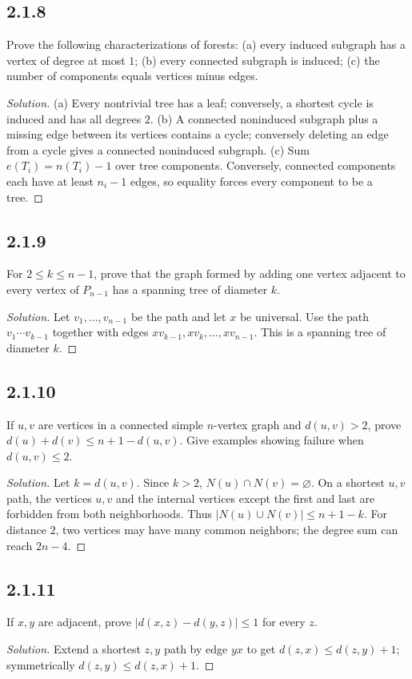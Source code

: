 \documentclass[12pt]{amsart}
\newenvironment{solution}{\begin{proof}[Solution]}{\end{proof}}
\begin{document}
    \subsection*{2.1.8} Prove the following characterizations of forests: (a) every induced subgraph has a vertex of degree at most $1$; (b) every connected subgraph is induced; (c) the number of components equals vertices minus edges.
    \begin{solution}(a) Every nontrivial tree has a leaf; conversely, a shortest cycle is induced and has all degrees $2$. (b) A connected noninduced subgraph plus a missing edge between its vertices contains a cycle; conversely deleting an edge from a cycle gives a connected noninduced subgraph. (c) Sum $e(T_i)=n(T_i)-1$ over tree components. Conversely, connected components each have at least $n_i-1$ edges, so equality forces every component to be a tree.\end{solution}
    \subsection*{2.1.9} For $2\le k\le n-1$, prove that the graph formed by adding one vertex adjacent to every vertex of $P_{n-1}$ has a spanning tree of diameter $k$.
    \begin{solution}Let $v_1,\dots,v_{n-1}$ be the path and let $x$ be universal. Use the path $v_1\cdots v_{k-1}$ together with edges $xv_{k-1},xv_k,\dots,xv_{n-1}$. This is a spanning tree of diameter $k$.\end{solution}
    \subsection*{2.1.10} If $u,v$ are vertices in a connected simple $n$-vertex graph and $d(u,v)>2$, prove $d(u)+d(v)\le n+1-d(u,v)$. Give examples showing failure when $d(u,v)\le2$.
    \begin{solution}Let $k=d(u,v)$. Since $k>2$, $N(u)\cap N(v)=\varnothing$. On a shortest $u,v$ path, the vertices $u,v$ and the internal vertices except the first and last are forbidden from both neighborhoods. Thus $|N(u)\cup N(v)|\le n+1-k$. For distance $2$, two vertices may have many common neighbors; the degree sum can reach $2n-4$.\end{solution}
    \subsection*{2.1.11} If $x,y$ are adjacent, prove $|d(x,z)-d(y,z)|\le1$ for every $z$.
    \begin{solution}Extend a shortest $z,y$ path by edge $yx$ to get $d(z,x)\le d(z,y)+1$; symmetrically $d(z,y)\le d(z,x)+1$.\end{solution}
\end{document}
